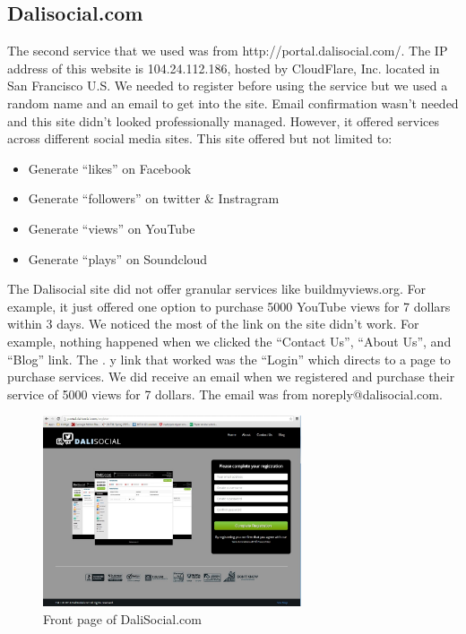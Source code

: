 \documentclass[conference]{IEEEtran}
\begin{document}
\subsection{Dalisocial.com}

The second service that we used was from http://portal.dalisocial.com/. The IP address of this website is 104.24.112.186, hosted by CloudFlare, Inc. located in San Francisco U.S. We needed to register before using the service but we used a random name and an email to get into the site. Email confirmation wasn’t needed and this site didn’t looked professionally managed. However, it offered services across different social media sites. This site offered but not limited to:

\begin{itemize}
  \item Generate ``likes'' on Facebook
  \item Generate ``followers'' on twitter \& Instragram
  \item Generate ``views'' on YouTube
  \item Generate ``plays'' on Soundcloud
\end{itemize}

The Dalisocial site did not offer granular services like buildmyviews.org. For example, it just offered one option to purchase 5000 YouTube views for 7 dollars within 3 days. We noticed the most of the link on the site didn’t work. For example, nothing happened when we clicked the ``Contact Us'', ``About Us'', and ``Blog'' link. The . y link that worked was the ``Login'' which directs to a page to purchase services. We did receive an email when we registered and purchase their service of 5000 views for 7 dollars. The email was from noreply@dalisocial.com.

\begin{figure}
  \centering
  \includegraphics[width=3.0in]{fig2}
  \caption{Front page of DaliSocial.com}
\end{figure}
\end{document}
